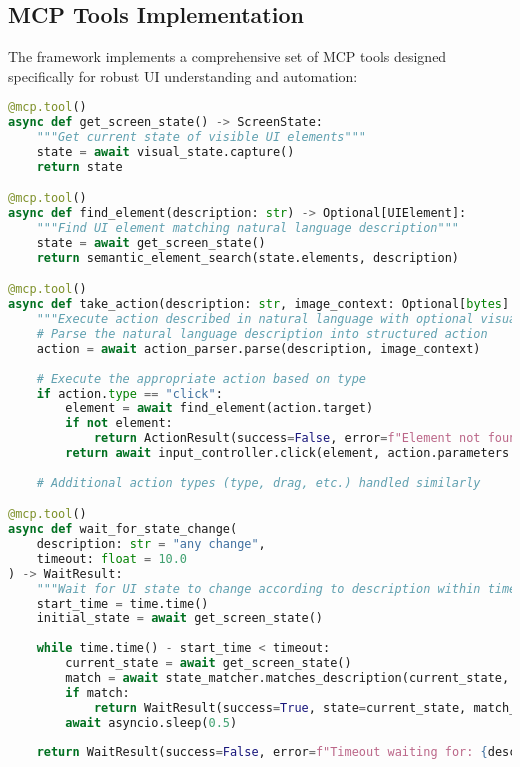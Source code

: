\documentclass{article}
\begin{document}
\subsection{MCP Tools Implementation}

The framework implements a comprehensive set of MCP tools designed specifically for robust UI understanding and automation:

\begin{lstlisting}[language=Python]
@mcp.tool()
async def get_screen_state() -> ScreenState:
    """Get current state of visible UI elements"""
    state = await visual_state.capture()
    return state

@mcp.tool()
async def find_element(description: str) -> Optional[UIElement]:
    """Find UI element matching natural language description"""
    state = await get_screen_state()
    return semantic_element_search(state.elements, description)

@mcp.tool()
async def take_action(description: str, image_context: Optional[bytes] = None) -> ActionResult:
    """Execute action described in natural language with optional visual context"""
    # Parse the natural language description into structured action
    action = await action_parser.parse(description, image_context)
    
    # Execute the appropriate action based on type
    if action.type == "click":
        element = await find_element(action.target)
        if not element:
            return ActionResult(success=False, error=f"Element not found: {action.target}")
        return await input_controller.click(element, action.parameters.get("click_type", "single"))
    
    # Additional action types (type, drag, etc.) handled similarly

@mcp.tool()
async def wait_for_state_change(
    description: str = "any change", 
    timeout: float = 10.0
) -> WaitResult:
    """Wait for UI state to change according to description within timeout"""
    start_time = time.time()
    initial_state = await get_screen_state()
    
    while time.time() - start_time < timeout:
        current_state = await get_screen_state()
        match = await state_matcher.matches_description(current_state, description, initial_state)
        if match:
            return WaitResult(success=True, state=current_state, match_details=match)
        await asyncio.sleep(0.5)
    
    return WaitResult(success=False, error=f"Timeout waiting for: {description}")


\end{lstlisting}
\end{document}
